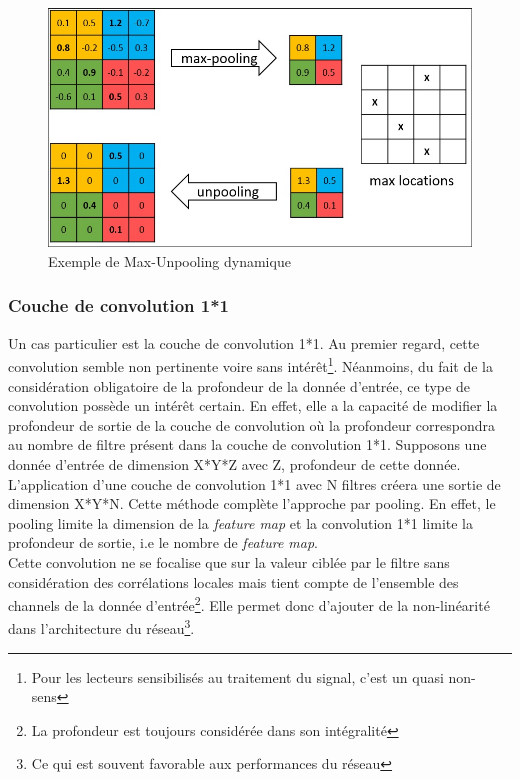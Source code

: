 \begin{figure}
    \centering
    \includegraphics[scale=0.3]{./tex/convolution-network/cnn/unpooling.png}
    \caption{Exemple de Max-Unpooling dynamique}
    \label{unpooling2}
\end{figure}

\subsubsection{Couche de convolution 1*1}
Un cas particulier est la couche de convolution 1*1. Au premier regard, cette convolution semble non pertinente voire sans intérêt\footnote{Pour les lecteurs sensibilisés au traitement du signal, c'est un quasi non-sens}. Néanmoins, du fait de la considération obligatoire de la profondeur de la donnée d'entrée, ce type de convolution possède un intérêt certain. En effet, elle a la capacité de modifier la profondeur de sortie de la couche de convolution où la profondeur correspondra au nombre de filtre présent dans la couche de convolution 1*1. Supposons une donnée d'entrée de dimension X*Y*Z avec Z, profondeur de cette donnée. L'application d'une couche de convolution 1*1 avec N filtres créera une sortie de dimension X*Y*N. Cette méthode complète l'approche par pooling. En effet, le pooling limite la dimension de la \textit{feature map} et la convolution 1*1 limite la profondeur de sortie, i.e le nombre de \textit{feature map}. \\

\noindent Cette convolution ne se focalise que sur la valeur ciblée par le filtre sans considération des corrélations locales mais tient compte de l'ensemble des channels de la donnée d'entrée\footnote{La profondeur est toujours considérée dans son intégralité}. Elle permet donc d'ajouter de la non-linéarité dans l'architecture du réseau\footnote{Ce qui est souvent favorable aux performances du réseau}.

